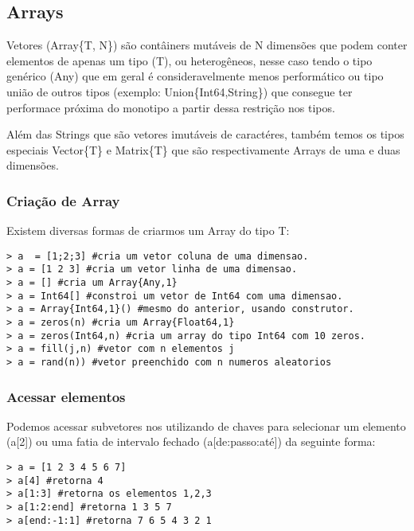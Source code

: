 \subsection{Arrays}
Vetores (Array\{T, N\}) são contâiners mutáveis de N dimensões que podem conter elementos de apenas um tipo (T), ou heterogêneos, nesse caso tendo o tipo genérico (Any) que em geral é consideravelmente menos performático ou tipo união de outros tipos (exemplo: Union\{Int64,String\}) que consegue ter performace próxima do monotipo a partir dessa restrição nos tipos.

Além das Strings que são vetores imutáveis de caractéres, também temos os tipos especiais Vector\{T\} e Matrix\{T\} que são respectivamente Arrays de uma e duas dimensões.

\subsubsection{Criação de Array}
Existem diversas formas de criarmos um Array do tipo T:
\begin{lstlisting}
> a  = [1;2;3] #cria um vetor coluna de uma dimensao.
> a = [1 2 3] #cria um vetor linha de uma dimensao.
> a = [] #cria um Array{Any,1}
> a = Int64[] #constroi um vetor de Int64 com uma dimensao.
> a = Array{Int64,1}() #mesmo do anterior, usando construtor.
> a = zeros(n) #cria um Array{Float64,1}
> a = zeros(Int64,n) #cria um array do tipo Int64 com 10 zeros.
> a = fill(j,n) #vetor com n elementos j
> a = rand(n)) #vetor preenchido com n numeros aleatorios
\end{lstlisting}

\subsubsection{Acessar elementos}
Podemos acessar subvetores nos utilizando de chaves para selecionar um elemento (a[2]) ou uma fatia de intervalo fechado (a[de:passo:até]) da seguinte forma:
\begin{lstlisting}
> a = [1 2 3 4 5 6 7] 
> a[4] #retorna 4
> a[1:3] #retorna os elementos 1,2,3
> a[1:2:end] #retorna 1 3 5 7
> a[end:-1:1] #retorna 7 6 5 4 3 2 1
\end{lstlisting}

